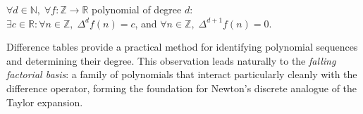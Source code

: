 \begin{remark*}
\(\forall d \in \mathbb{N},\; \forall f : \mathbb{Z}\to\mathbb{R}\) polynomial of degree \(d\):\\
\(\exists c \in \mathbb{R}: \forall n \in \mathbb{Z},\; \Delta^d f(n) = c\),
and \(\forall n \in \mathbb{Z},\; \Delta^{d+1}f(n) = 0\).
\end{remark*}

\begin{remark*}[Consequence]
Difference tables provide a practical method for identifying polynomial
sequences and determining their degree. This observation leads naturally to
the \emph{falling factorial basis}: a family of polynomials that interact
particularly cleanly with the difference operator, forming the foundation
for Newton's discrete analogue of the Taylor expansion.
\end{remark*}
